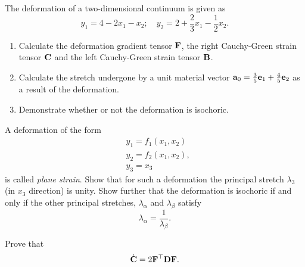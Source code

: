 \begin{exercise}
	The deformation of a two-dimensional continuum is given as
	$$
	y_1=4-2x_1-x_2; \quad y_2=2+\frac{2}{3}x_1-\frac{1}{2}x_2.
	$$
	\begin{enumerate}
			\item Calculate the deformation gradient tensor $\mathbf{F}$, the right Cauchy-Green strain tensor $\mathbf{C}$ and the left Cauchy-Green strain tensor $\mathbf{B}$.
			\item Calculate the stretch undergone by a unit material vector $\mathbf{a}_0=\frac{3}{5}\mathbf{e}_1+\frac{4}{5}\mathbf{e}_2$ as a result of the deformation.
			\item Demonstrate whether or not the deformation is isochoric. 
		\end{enumerate}
\end{exercise}

\begin{exercise}
	A deformation of the form
$$
	\begin{aligned}
		& y_1=f_1(x_1,x_2)\\
		& y_2=f_2(x_1,x_2),\\
		& y_3=x_3
		\end{aligned}
$$
	is called \textit{plane strain}. Show that for such a deformation the principal stretch $\lambda_3$ (in $x_3$ direction) is unity. Show further that the deformation is isochoric if and only if the other principal stretches, $\lambda_\alpha$ and $\lambda_\beta$ satisfy
	$$
	\lambda_\alpha=\frac{1}{\lambda_\beta}.
	$$
\end{exercise}
%
%
%
\begin{exercise}
	Prove that
	$$
	\dot{\mathbf{C}}=2\mathbf{F}^\top\mathbf{D}\mathbf{F}.
	$$
\end{exercise}


